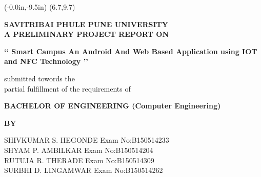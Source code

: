 \documentclass[10pt,a4paper]
{article}
\numberwithin{table}{section}
\begin{document}
\newpage

\pagestyle{empty}
	\thisfancyput(-0.0in,-9.5in){%
\setlength{\unitlength}{1in}\framebox(6.7,9.7)}


\begin{center}
      \vspace{0.7 in}
      \textbf{SAVITRIBAI PHULE PUNE UNIVERSITY}
      \vspace{0.5 in}\\
       \textbf{A PRELIMINARY PROJECT REPORT ON}
			\end{center}
\vspace{0.2 in}
	\begin{center} \textbf 
{\Large \lq \lq \vspace{0.2in} Smart Campus  An Android And Web Based Application using IOT and NFC Technology \rq \rq}
	\end{center}
     \vspace{0.2 in}
	\begin{center}
	 submitted towords the\\
partial fulfillment of the requirements of
 
	\end{center}
	\vspace{0.2 in}
	
	\begin{center}
	   \textbf{BACHELOR OF ENGINEERING (Computer Engineering)}
	\end{center}
	\vspace{0.05 in}
	
	\begin{center}
	   \textbf{BY}
	\end{center}
	\vspace{0.2 in}
\begin{center}	
SHIVKUMAR S. HEGONDE \hspace{10mm} Exam No:B150514233\\
SHYAM P. AMBILKAR \hspace{17.6 mm} Exam No:B150514204   \\
RUTUJA R. THERADE    \hspace{18.2 mm} Exam No:B150514309  \\
SURBHI D. LINGAMWAR \hspace{13.4 mm} Exam No:B150514262   \\
\end{center}
\end{document}
